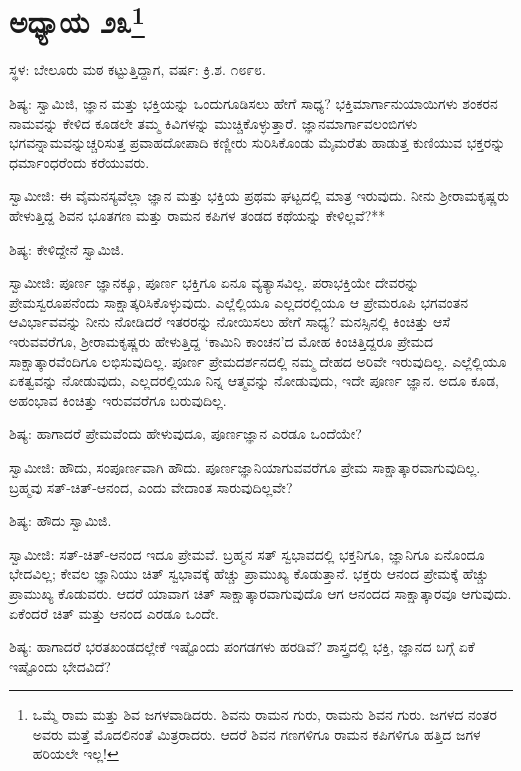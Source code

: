 \newpage

\chapter[ಅಧ್ಯಾಯ ೨೩]{ಅಧ್ಯಾಯ ೨೩\protect\footnote{ಒಮ್ಮೆ ರಾಮ ಮತ್ತು ಶಿವ ಜಗಳವಾಡಿದರು. ಶಿವನು ರಾಮನ ಗುರು, ರಾಮನು ಶಿವನ ಗುರು. ಜಗಳದ ನಂತರ ಅವರು ಮತ್ತೆ ಮೊದಲಿನಂತೆ ಮಿತ್ರರಾದರು. ಆದರೆ ಶಿವನ ಗಣಗಳಿಗೂ ರಾಮನ ಕಪಿಗಳಿಗೂ ಹತ್ತಿದ ಜಗಳ ಹರಿಯಲೇ ಇಲ್ಲ!}}

\centerline{ಸ್ಥಳ: ಬೇಲೂರು ಮಠ ಕಟ್ಟುತ್ತಿದ್ದಾಗ, ವರ್ಷ: ಕ್ರಿ.ಶ. ೧೮೯೮.}

ಶಿಷ್ಯ: ಸ್ವಾಮಿಜಿ, ಜ್ಞಾನ ಮತ್ತು ಭಕ್ತಿಯನ್ನು ಒಂದುಗೂಡಿಸಲು ಹೇಗೆ ಸಾಧ್ಯ? ಭಕ್ತಿಮಾರ್ಗಾನುಯಾಯಿಗಳು ಶಂಕರನ ನಾಮವನ್ನು ಕೇಳಿದ ಕೂಡಲೇ ತಮ್ಮ ಕಿವಿಗಳನ್ನು ಮುಚ್ಚಿಕೊಳ್ಳುತ್ತಾರೆ. ಜ್ಞಾನಮಾರ್ಗಾವಲಂಬಿಗಳು ಭಗವನ್ನಾಮವನ್ನುಚ್ಚರಿಸುತ್ತ ಪ್ರವಾಹದೋಪಾದಿ ಕಣ್ಣೀರು ಸುರಿಸಿಕೊಂಡು ಮೈಮರೆತು ಹಾಡುತ್ತ ಕುಣಿಯುವ ಭಕ್ತರನ್ನು ಧರ್ಮಾಂಧರೆಂದು ಕರೆಯುವರು.

ಸ್ವಾಮೀಜಿ: ಈ ವೈಮನಸ್ಯವೆಲ್ಲಾ ಜ್ಞಾನ ಮತ್ತು ಭಕ್ತಿಯ ಪ್ರಥಮ ಘಟ್ಟದಲ್ಲಿ ಮಾತ್ರ ಇರುವುದು. ನೀನು ಶ‍್ರೀರಾಮಕೃಷ್ಣರು ಹೇಳುತ್ತಿದ್ದ ಶಿವನ ಭೂತಗಣ ಮತ್ತು ರಾಮನ ಕಪಿಗಳ ತಂಡದ ಕಥೆಯನ್ನು ಕೇಳಿಲ್ಲವೆ?**

ಶಿಷ್ಯ: ಕೇಳಿದ್ದೇನೆ ಸ್ವಾಮಿಜಿ.

ಸ್ವಾಮೀಜಿ: ಪೂರ್ಣ ಜ್ಞಾನಕ್ಕೂ, ಪೂರ್ಣ ಭಕ್ತಿಗೂ ಏನೂ ವ್ಯತ್ಯಾಸವಿಲ್ಲ. ಪರಾಭಕ್ತಿಯೇ ದೇವರನ್ನು ಪ್ರೇಮಸ್ವರೂಪನೆಂದು ಸಾಕ್ಷಾತ್ಕರಿಸಿಕೊಳ್ಳುವುದು. ಎಲ್ಲೆಲ್ಲಿಯೂ ಎಲ್ಲದರಲ್ಲಿಯೂ ಆ ಪ್ರೇಮರೂಪಿ ಭಗವಂತನ ಆವಿರ್ಭಾವವನ್ನು ನೀನು ನೋಡಿದರೆ ಇತರರನ್ನು ನೋಯಿಸಲು ಹೇಗೆ ಸಾಧ್ಯ? ಮನಸ್ಸಿನಲ್ಲಿ ಕಿಂಚಿತ್ತು ಆಸೆ ಇರುವವರೆಗೂ, ಶ‍್ರೀರಾಮಕೃಷ್ಣರು ಹೇಳುತ್ತಿದ್ದ ‘ಕಾಮಿನಿ ಕಾಂಚನ’ದ ಮೋಹ ಕಿಂಚಿತ್ತಿದ್ದರೂ ಪ್ರೇಮದ ಸಾಕ್ಷಾತ್ಕಾರವೆಂದಿಗೂ ಲಭಿಸುವುದಿಲ್ಲ. ಪೂರ್ಣ ಪ್ರೇಮದರ್ಶನದಲ್ಲಿ ನಮ್ಮ ದೇಹದ ಅರಿವೇ ಇರುವುದಿಲ್ಲ. ಎಲ್ಲೆಲ್ಲಿಯೂ ಏಕತ್ವವನ್ನು ನೋಡುವುದು, ಎಲ್ಲದರಲ್ಲಿಯೂ ನಿನ್ನ ಆತ್ಮವನ್ನು ನೋಡುವುದು, ಇದೇ ಪೂರ್ಣ ಜ್ಞಾನ. ಅದೂ ಕೂಡ, ಅಹಂಭಾವ ಕಿಂಚಿತ್ತು ಇರುವವರೆಗೂ ಬರುವುದಿಲ್ಲ.

ಶಿಷ್ಯ: ಹಾಗಾದರೆ ಪ್ರೇಮವೆಂದು ಹೇಳುವುದೂ, ಪೂರ್ಣಜ್ಞಾನ ಎರಡೂ ಒಂದೆಯೇ?

ಸ್ವಾಮೀಜಿ: ಹೌದು, ಸಂಪೂರ್ಣವಾಗಿ ಹೌದು. ಪೂರ್ಣಜ್ಞಾನಿಯಾಗುವವರೆಗೂ ಪ್ರೇಮ ಸಾಕ್ಷಾತ್ಕಾರವಾಗುವುದಿಲ್ಲ. ಬ್ರಹ್ಮವು ಸತ್-ಚಿತ್-ಆನಂದ, ಎಂದು ವೇದಾಂತ ಸಾರುವುದಿಲ್ಲವೇ?

ಶಿಷ್ಯ: ಹೌದು ಸ್ವಾಮಿಜಿ.

ಸ್ವಾಮೀಜಿ: ಸತ್-ಚಿತ್-ಆನಂದ ಇದೂ ಪ್ರೇಮವೆ. ಬ್ರಹ್ಮನ ಸತ್ ಸ್ವಭಾವದಲ್ಲಿ ಭಕ್ತನಿಗೂ, ಜ್ಞಾನಿಗೂ ಏನೊಂದೂ ಭೇದವಿಲ್ಲ; ಕೇವಲ ಜ್ಞಾನಿಯು ಚಿತ್ ಸ್ವಭಾವಕ್ಕೆ ಹೆಚ್ಚು ಪ್ರಾಮುಖ್ಯ ಕೊಡುತ್ತಾನೆ. ಭಕ್ತರು ಆನಂದ ಪ್ರೇಮಕ್ಕೆ ಹೆಚ್ಚು ಪ್ರಾಮುಖ್ಯ ಕೊಡುವರು. ಆದರೆ ಯಾವಾಗ ಚಿತ್ ಸಾಕ್ಷಾತ್ಕಾರವಾಗುವುದೊ ಆಗ ಆನಂದದ ಸಾಕ್ಷಾತ್ಕಾರವೂ ಆಗುವುದು. ಏಕೆಂದರೆ ಚಿತ್ ಮತ್ತು ಆನಂದ ಎರಡೂ ಒಂದೇ.

ಶಿಷ್ಯ: ಹಾಗಾದರೆ ಭರತಖಂಡದಲ್ಲೇಕೆ ಇಷ್ಟೊಂದು ಪಂಗಡಗಳು ಹರಡಿವೆ? ಶಾಸ್ತ್ರದಲ್ಲಿ ಭಕ್ತಿ, ಜ್ಞಾನದ ಬಗ್ಗೆ ಏಕೆ ಇಷ್ಟೊಂದು ಭೇದವಿದೆ?

